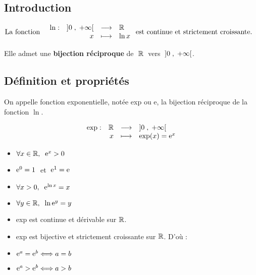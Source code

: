 
\everymath{\displaystyle}


 \subsection*{Introduction}
  $ \text{La fonction } \;\;\begin{array}{lrcl}
\ln : & \left]0 \;,\; +\infty\right[ & \longrightarrow & \mathbb{R} \\ 
      & x                & \longmapsto     & \ln x
\end{array} \;\text{est continue et strictement croissante.}$
    
    
 Elle admet une    \textbf{ bijection  réciproque } de $\; \mathbb{R}  \;$ vers $\;\left]0 \;,\; +\infty\right[ $.

\subsection{Définition et propriétés}

\begin{definition}
On appelle fonction  exponentielle,  notée     exp  ou e, la bijection réciproque de la fonction $ \ln $.
\end{definition}

\begin{notation}
 $$ \begin{array}{lrcl}
\text{exp} : & \mathbb{R} & \longrightarrow & \left]0 \;,\; +\infty\right[ \\
             & x   & \longmapsto     & \text{exp}(x) = \mathrm{e}^{x}
\end{array} $$
\end{notation}
\begin{corollary}
\begin{itemize}
\item $ \forall x \in \mathbb{R},\; \; \mathrm{e}^{x}> 0 $ 

\item $  \mathrm{e}^{0}= 1   \; $ et $ \;    \mathrm{e}^{1}= \mathrm{e} $

 \item $\forall x> 0,\; \; \mathrm{e}^{\ln{x} }=x  $ 
 
 \item $\forall y\in \mathbb{R} ,\; \; \ln {\mathrm{e}^{y}}=y  $ 
  
  \item exp   est continue et dérivable sur  $\mathbb{R}$.
  \item exp   est bijective et  strictement croissante  sur $\mathbb{R}$. D'où :
  
  \item $ \mathrm{e}^{a}=\mathrm{e}^{b}\Longleftrightarrow a=b $
  
\item $ \mathrm{e}^{a}> \mathrm{e}^{b}\Longleftrightarrow a>b $
 
\end{itemize}

\end{corollary}


